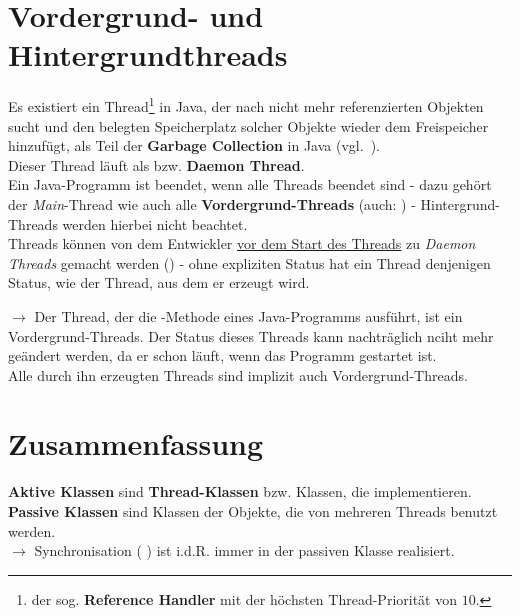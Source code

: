 \section{Vordergrund- und Hintergrundthreads}

Es existiert ein Thread\footnote{
der sog. \textbf{Reference Handler} mit der höchsten Thread-Priorität von $10$.
} in Java, der nach nicht mehr referenzierten Objekten sucht und den belegten Speicherplatz solcher Objekte wieder dem Freispeicher hinzufügt, als Teil der \textbf{Garbage Collection} in Java (vgl.~\cite[88]{Oec22}).\\
\noindent
Dieser Thread läuft als  bzw. \textbf{Daemon Thread}.\\

\noindent
Ein Java-Programm ist beendet, wenn alle Threads beendet sind - dazu gehört der \textit{Main}-Thread wie auch alle \textbf{Vordergrund-Threads} (auch: ) - Hintergrund-Threads werden hierbei nicht beachtet.\\

\noindent
Threads können von dem Entwickler \ul{vor dem Start des Threads} zu \textit{Daemon Threads} gemacht werden () - ohne expliziten Status hat ein Thread denjenigen Status, wie der Thread, aus dem er erzeugt wird.

\noindent
$\rightarrow$ Der Thread, der die -Methode eines Java-Programms ausführt, ist ein Vordergrund-Threads.
Der Status dieses Threads kann nachträglich nciht mehr geändert werden, da er schon läuft, wenn das Programm gestartet ist.\\
Alle durch ihn erzeugten Threads sind implizit auch Vordergrund-Threads.

\section{Zusammenfassung}

\textbf{Aktive Klassen} sind \textbf{Thread-Klassen} bzw. Klassen, die  implementieren.\\

\noindent
\textbf{Passive Klassen} sind Klassen der Objekte, die von mehreren Threads benutzt werden.\\

$\rightarrow$ Synchronisation ( ) ist i.d.R. immer in der passiven Klasse realisiert.